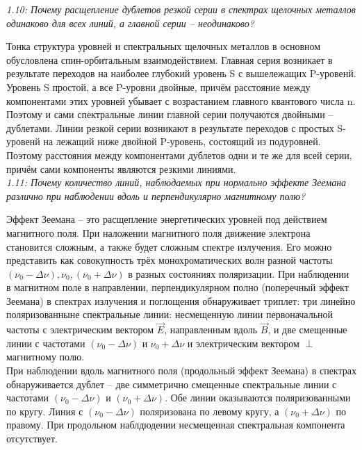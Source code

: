     \emph{1.10: Почему расщепление дублетов резкой серии в спектрах 
    	щелочных металлов одинаково для всех линий, а главной серии -- 
        неодинаково?}
        
        Тонка структура уровней и спектральных щелочных металлов в 
        основном обусловлена спин-орбитальным взаимодействием. Главная 
        серия возникает в результате переходов на наиболее глубокий 
        уровень S с вышележащих P-уровенй. Уровень S простой, а все 
        P-уровни двойные, причём расстояние между компонентами этих 
        уровней убывает с возрастанием главного квантового числа n. 
        Поэтому и сами спектральные линии главной серии получаются 
        двойными -- дублетами. Линии резкой серии возникают в 
        результате переходов с простых S-уровенй на лежащий ниже 
        двойной P-уровень, состоящий из подуровней. Поэтому расстояния 
        между компонентами дублетов одни и те же для всей серии, причём 
        сами компоненты являются резкими линиями.\\

    \emph{1.11: Почему количество линий, наблюдаемых при нормально эффекте 
        Зеемана различно при наблюдении вдоль и перпендикулярно 
        магнитному полю?}

        Эффект Зеемана -- это расщепление энергетических уровней под 
        действием магнитного поля. При наложении магнитного поля 
        движение электрона становится сложным, а также будет сложным 
        спектре излучения. Его можно представить как совокупность трёх 
        монохроматических волн разной частоты 
        \( (\nu_0 - \Delta \nu), \nu_0, (\nu_0 + \Delta \nu) \) 
        в разных состояниях поляризации. При наблюдении в магнитном 
        поле в направлении, перпендикулярном полно (поперечный эффект 
        Зеемана) в спектрах излучения и поглощения обнаруживает 
        триплет: три линейно поляризованныне спектральные линии: 
        несмещенную линии первоначальной частоты с электрическим вектором 
        \( \vec{E} \), направленным вдоль \( \vec{B} \), и две 
        смещенные линии с частотами \( (\nu_0 - \Delta \nu) \) и 
        \( \nu_0 + \Delta \nu \) и электрическим вектором \( \perp \) 
        магнитному полю.\\
        
        При наблюдении вдоль магнитного поля (продольный эффект Зеемана) 
        в спектрах обнаруживается дублет -- две симметрично смещенные 
        спектральные линии с частотами 
        \( (\nu_0 - \Delta \nu) \) и \( (\nu_0 + \Delta \nu) \). 
        Обе линии оказываются поляризованными по кругу. Линия с 
        \( (\nu_0 - \Delta \nu) \) поляризована по левому кругу, а
        \( (\nu_0 + \Delta \nu) \) по правому. При продольном наблдюдении 
        несмещенная спектральная компонента отсутствует. 
   

